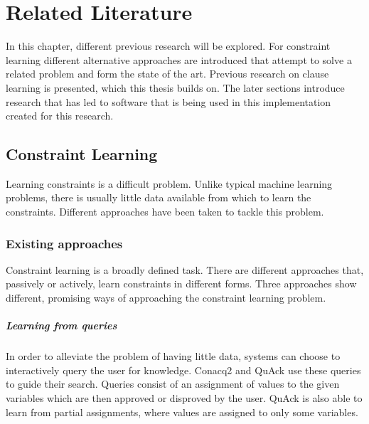 \chapter{Related Literature}
\label{cha:rellit}

In this chapter, different previous research will be explored.
For constraint learning different alternative approaches are introduced that attempt to solve a related problem and form the state of the art.
Previous research on clause learning is presented, which this thesis builds on.
The later sections introduce research that has led to software that is being used in this implementation created for this research.

\section{Constraint Learning}
Learning constraints is a difficult problem.
Unlike typical machine learning problems, there is usually little data available from which to learn the constraints.
Different approaches have been taken to tackle this problem.

\subsection{Existing approaches}
Constraint learning is a broadly defined task.
There are different approaches that, passively or actively, learn constraints in different forms.
Three approaches show different, promising ways of approaching the constraint learning problem.

\paragraph{Learning from queries}
In order to alleviate the problem of having little data, systems can choose to interactively query the user for knowledge.
Conacq2 \cite{bessiere2007query} and QuAck \cite{bessiere2013constraint} use these queries to guide their search.
Queries consist of an assignment of values to the given variables which are then approved or disproved by the user.
QuAck is also able to learn from partial assignments, where values are assigned to only some variables. 

